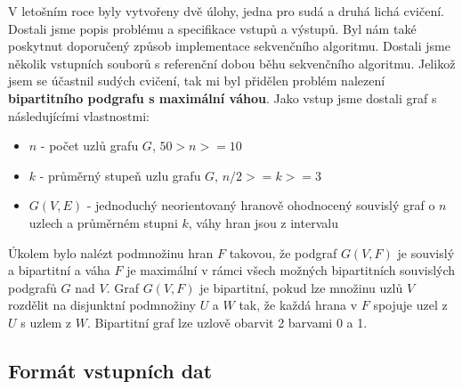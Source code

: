 V letošním roce byly vytvořeny dvě úlohy, jedna pro sudá a druhá lichá cvičení.
Dostali jsme popis problému a specifikace vstupů a výstupů.
Byl nám také poskytnut doporučený způsob implementace sekvenčního algoritmu.
Dostali jsme několik vstupních souborů s referenční dobou běhu sekvenčního algoritmu.
Jelikož jsem se účastnil sudých cvičení, tak mi byl přidělen problém nalezení \textbf{bipartitního podgrafu s maximální váhou}. Jako vstup jsme dostali graf s následujícími vlastnostmi:

\begin{itemize}
    \item \(n\) - počet uzlů grafu \(G\), \(50 > n >= 10\)
    \item \(k\) - průměrný stupeň uzlu grafu \(G\), \(n/2 >= k >= 3\)
    \item \(G(V,E)\) - jednoduchý neorientovaný hranově ohodnocený souvislý graf o \(n\) uzlech a průměrném stupni \(k\), váhy hran jsou z intervalu \(<80,120>\)
\end{itemize}

Úkolem bylo nalézt podmnožinu hran \(F\) takovou, že podgraf \(G(V,F)\) je souvislý a bipartitní a váha \(F\) je maximální v rámci všech možných bipartitních souvislých podgrafů \(G\) nad \(V\).
Graf \(G(V,F)\) je bipartitní, pokud lze množinu uzlů \(V\) rozdělit na disjunktní podmnožiny \(U\) a \(W\) tak, že každá hrana v \(F\) spojuje uzel z \(U\) s uzlem z \(W\).
Bipartitní graf lze uzlově obarvit 2 barvami 0 a 1.

\subsection{Formát vstupních dat}